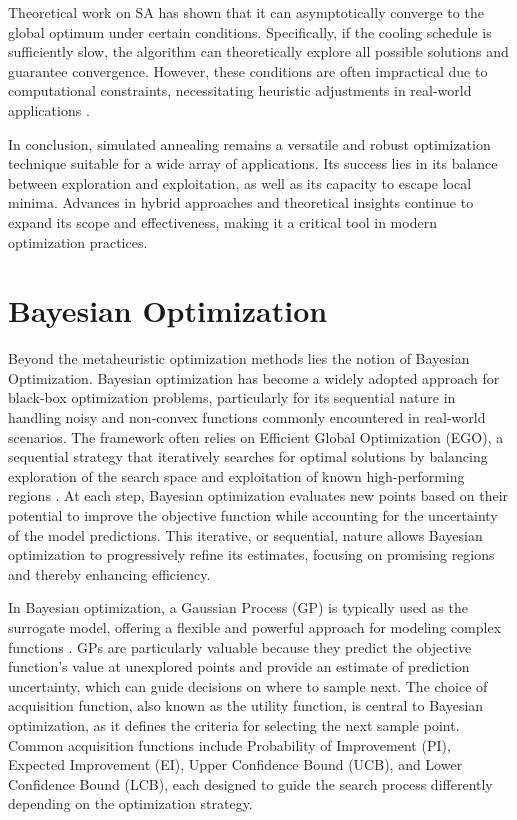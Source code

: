 Theoretical work on SA has shown that it can asymptotically converge to the global optimum under certain conditions. Specifically, if the cooling schedule is sufficiently slow, the algorithm can theoretically explore all possible solutions and guarantee convergence. However, these conditions are often impractical due to computational constraints, necessitating heuristic adjustments in real-world applications \parencite{hajek1988cooling}.

In conclusion, simulated annealing remains a versatile and robust optimization technique suitable for a wide array of applications. Its success lies in its balance between exploration and exploitation, as well as its capacity to escape local minima. Advances in hybrid approaches and theoretical insights continue to expand its scope and effectiveness, making it a critical tool in modern optimization practices.


\section{Bayesian Optimization}
Beyond the metaheuristic optimization methods lies the notion of Bayesian Optimization. Bayesian optimization has become a widely adopted approach for black-box optimization problems, particularly for its sequential nature in handling noisy and non-convex functions commonly encountered in real-world scenarios. The framework often relies on Efficient Global Optimization (EGO), a sequential strategy that iteratively searches for optimal solutions by balancing exploration of the search space and exploitation of known high-performing regions \parencite{jones1998efficient}. At each step, Bayesian optimization evaluates new points based on their potential to improve the objective function while accounting for the uncertainty of the model predictions. This iterative, or sequential, nature allows Bayesian optimization to progressively refine its estimates, focusing on promising regions and thereby enhancing efficiency.

In Bayesian optimization, a Gaussian Process (GP) is typically used as the surrogate model, offering a flexible and powerful approach for modeling complex functions \parencite{rasmussen2006gaussian}. GPs are particularly valuable because they predict the objective function's value at unexplored points and provide an estimate of prediction uncertainty, which can guide decisions on where to sample next. The choice of acquisition function, also known as the utility function, is central to Bayesian optimization, as it defines the criteria for selecting the next sample point. Common acquisition functions include Probability of Improvement (PI), Expected Improvement (EI), Upper Confidence Bound (UCB), and Lower Confidence Bound (LCB), each designed to guide the search process differently depending on the optimization strategy.

